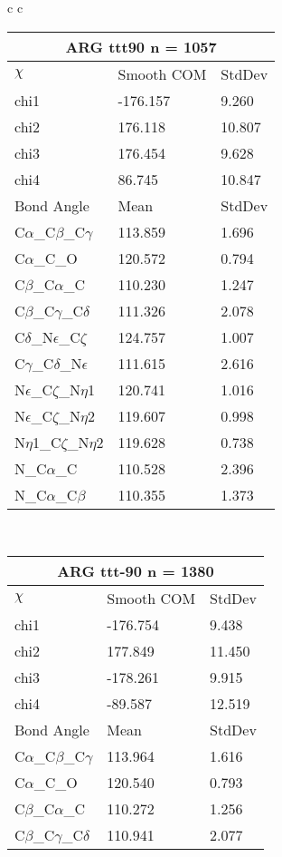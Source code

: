 \begin{longtable}{ c c }
\begin{tabular}{ l l l }
  \toprule
  \multicolumn{3}{c}{ARG \textbf{ttt90} n = 1057} \\ \toprule
  $\chi$       & Smooth COM & StdDev \\ \midrule
  chi1 & -176.157 & 9.260 \\ 
  chi2 & 176.118 & 10.807 \\ 
  chi3 & 176.454 & 9.628 \\ 
  chi4 & 86.745 & 10.847 \\ \midrule
  Bond Angle   & Mean     & StdDev \\ \midrule
  C$\alpha$\_C$\beta$\_C$\gamma$ & 113.859 & 1.696\\
  C$\alpha$\_C\_O & 120.572 & 0.794\\
  C$\beta$\_C$\alpha$\_C & 110.230 & 1.247\\
  C$\beta$\_C$\gamma$\_C$\delta$ & 111.326 & 2.078\\
  C$\delta$\_N$\epsilon$\_C$\zeta$ & 124.757 & 1.007\\
  C$\gamma$\_C$\delta$\_N$\epsilon$ & 111.615 & 2.616\\
  N$\epsilon$\_C$\zeta$\_N$\eta$1 & 120.741 & 1.016\\
  N$\epsilon$\_C$\zeta$\_N$\eta$2 & 119.607 & 0.998\\
  N$\eta$1\_C$\zeta$\_N$\eta$2 & 119.628 & 0.738\\
  N\_C$\alpha$\_C & 110.528 & 2.396\\
  N\_C$\alpha$\_C$\beta$ & 110.355 & 1.373\\
  \bottomrule
  \end{tabular}
  \\
  \begin{tabular}{ l l l }
  \toprule
  \multicolumn{3}{c}{ARG \textbf{ttt-90} n = 1380} \\ \toprule
  $\chi$       & Smooth COM & StdDev \\ \midrule
  chi1 & -176.754 & 9.438 \\ 
  chi2 & 177.849 & 11.450 \\ 
  chi3 & -178.261 & 9.915 \\ 
  chi4 & -89.587 & 12.519 \\ \midrule
  Bond Angle   & Mean     & StdDev \\ \midrule
  C$\alpha$\_C$\beta$\_C$\gamma$ & 113.964 & 1.616\\
  C$\alpha$\_C\_O & 120.540 & 0.793\\
  C$\beta$\_C$\alpha$\_C & 110.272 & 1.256\\
  C$\beta$\_C$\gamma$\_C$\delta$ & 110.941 & 2.077\\

\end{tabular}
\end{longtable}
